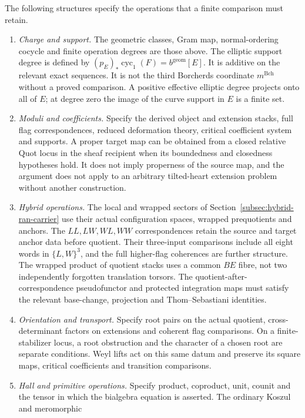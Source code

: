 The following structures specify the operations that a finite
comparison must retain.
\begin{enumerate}
\item \emph{Charge and support.} The geometric classes, Gram map,
  normal-ordering cocycle and finite operation degrees are those
  above. The elliptic support degree is defined by
  \((p_E)_*\operatorname{cyc}_1(F)=b^{\mathrm{geom}}[E]\).
  It is additive on the relevant exact sequences. It is not the
  third Borcherds coordinate \(m^{\mathrm{Bch}}\) without a proved
  comparison. A positive effective elliptic degree projects onto
  all of \(E\); at degree zero the image of the curve support
  in \(E\) is a finite set.
\item \emph{Moduli and coefficients.} Specify the derived object
  and extension stacks, full flag correspondences, reduced
  deformation theory, critical coefficient system and supports.
  A proper target map can be obtained from a closed relative Quot
  locus in the sheaf recipient when its boundedness and closedness
  hypotheses hold. It does not imply properness of the source map,
  and the argument does not apply to an arbitrary tilted-heart
  extension problem without another construction.
\item \emph{Hybrid operations.} The local and wrapped sectors of
  Section~\ref{subsec:hybrid-ran-carrier} use their actual
  configuration spaces, wrapped prequotients and anchors. The
  \(LL,LW,WL,WW\) correspondences retain the source and target
  anchor data before quotient. Their three-input comparisons include
  all eight words in \(\{L,W\}^3\), and the full higher-flag
  coherences are further structure. The wrapped product of quotient
  stacks uses a common \(BE\) fibre, not two independently
  forgotten translation torsors. The quotient-after-correspondence
  pseudofunctor and protected integration maps must satisfy the
  relevant base-change, projection and Thom--Sebastiani identities.
\item \emph{Orientation and transport.} Specify root pairs on the
  actual quotient, cross-determinant factors on extensions and
  coherent flag comparisons. On a finite-stabilizer locus, a root
  obstruction and the character of a chosen root are separate
  conditions. Weyl lifts act on this same datum and preserve its
  square maps, critical coefficients and transition comparisons.
\item \emph{Hall and primitive operations.} Specify product,
  coproduct, unit, counit and the tensor in which the bialgebra
  equation is asserted. The ordinary Koszul and meromorphic

\end{enumerate}
